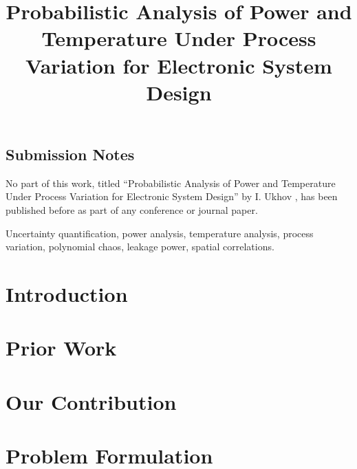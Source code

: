 \documentclass[journal]{IEEEtran}
\begin{document}
  \begin{titlepage}
    \section*{{\Huge Submission Notes}}
    \begin{spacing}{1.2}
    \vspace{1em}
    \Large
    No part of this work, titled ``Probabilistic Analysis of Power and Temperature Under Process Variation for Electronic System Design'' by I. Ukhov \etal, has been published before as part of any conference or journal paper.
    \end{spacing}
  \end{titlepage}

  \title{\TitleFont Probabilistic Analysis of Power and Temperature Under Process Variation for Electronic System Design}

  \author{
    
  }

  \maketitle

  \begin{abstract}
    
  \end{abstract}

  \begin{IEEEkeywords}
    Uncertainty quantification, power analysis, temperature analysis, process variation, polynomial chaos, leakage power, spatial correlations.
  \end{IEEEkeywords}

  \section{Introduction} 
  

  \section{Prior Work} 
  

  \section{Our Contribution} 
  

  \section{Problem Formulation} 
  
\end{document}
